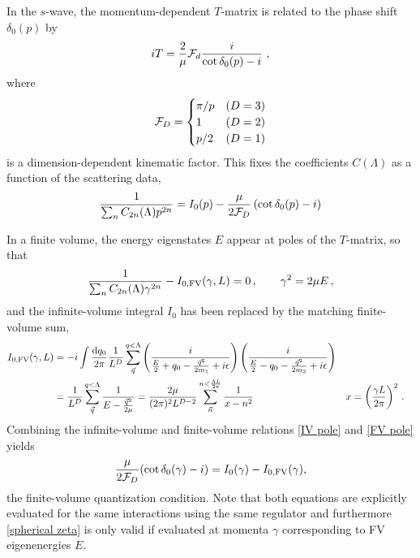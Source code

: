 In the $s$-wave, the momentum-dependent $T$-matrix is related to the phase shift $\delta_0(p)$ by
\begin{equation}\label{eq:cot delta}
    i T = \frac{2}{\mu}\mathcal{F}_d\frac{i}{\cot \delta_0(p)-i}\ ,
\end{equation}
where
\begin{equation}\label{eq:spherical FD}
    \mathcal{F}_D
    =
    \begin{cases}
        \pi/p   & (D=3)\\
        1       & (D=2)\\
        p/2     & (D=1)
\end{cases}
\end{equation}
is a dimension-dependent kinematic factor.
This fixes the coefficients $C(\Lambda)$ as a function of the scattering data,
\begin{equation}\label{eq:IV pole}
    \frac{1}{\sum_n C_{2n}(\Lambda) p^{2n}}
    =
    I_0(p) - \frac{\mu}{2 \mathcal{F}_D}\left(\cot \delta_0(p) - i\right)
\end{equation}

In a finite volume, the energy eigenstates $E$ appear at poles of the $T$-matrix, so that
\begin{equation}\label{eq:FV pole}
    \frac{1}{\sum_n C_{2n}(\Lambda) \gamma^{2n}} - I_{0,\textrm{FV}}(\gamma,L) = 0 \, ,
    \qquad
    \gamma^2 = 2 \mu E\, ,
\end{equation}
and the infinite-volume integral $I_0$ has been replaced by the matching finite-volume sum,
\begin{align}
I_{0,\textrm{FV}}(\gamma,L)
    &=-i\int \frac { \mathrm {d}q_0}{2\pi} \frac{1}{L^D}\sum_{\vec{q}}^{q < \Lambda} \left( \frac { i } { \frac{E}{2} + q _ { 0 } - \frac{\vec{q}^2}{2m_1} + i \epsilon } \right) \left( \frac { i } { \frac{E}{2} - q _ { 0 } - \frac{\vec{q}^2}{2m_2} + i \epsilon } \right)
    \\
    &=\frac{1}{L^D}\sum_{\vec{q}}^{q < \Lambda} \frac { 1 } { E - \frac{\vec{q}^2}{2\mu} }
    =\frac{2\mu}{(2\pi)^2 L^{D-2}} \sum_{\vec{n}}^{n < \frac{\Lambda L}{2\pi}} \frac{1}{x-n^2}
    &
    x &= \left( \frac{\gamma L}{2\pi}\right)^2
    \, .
\end{align}
Combining the infinite-volume and finite-volume relations \eqref{IV pole} and \eqref{FV pole} yields
\begin{equation}\label{eq:spherical zeta}
    \frac{\mu}{2\mathcal{F}_D}(\cot\delta_0(\gamma)-i) = I_0(\gamma) - I_{0,\textrm{FV}}(\gamma),
\end{equation}
the finite-volume quantization condition.
Note that both equations are explicitly evaluated for the same interactions using the same regulator and furthermore \eqref{spherical zeta} is only valid if evaluated at momenta $\gamma$ corresponding to FV eigenenergies $E$.

